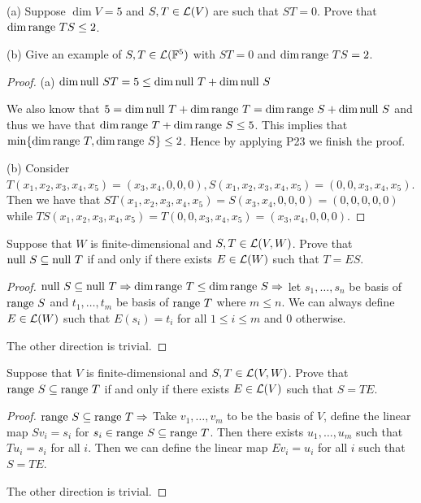 \documentclass{extarticle}
\begin{document}
\begin{problem}{24}
    (a) Suppose \(\dim V = 5\) and \(S, T \in \mathcal{L}(V)\) are such 
    that \(ST = 0\). Prove that \(\dim \text{range } TS \leq 2\). 

    (b) Give an example of \(S, T \in \mathcal{L}(\mathbb{F}^5)\) with \(ST=0\) and \(\dim \text{range } TS = 2\).
    
\end{problem}


\begin{proof}
(a) \(\dim \text{null } ST = 5 \leq \dim \text{null } T + \dim \text{null } S\)

We also know that  \(5 = \dim \text{null } T + \dim \text{range } T = \dim \text{range } S + \dim \text{null } S\) 
and thus we have that \(\dim \text{range } T + \dim \text{range } S \leq 5\). This implies that \(\min 
\{\dim \text{range } T, \dim \text{range } S\} \leq 2\). Hence by applying P23 we finish the proof. 

(b) Consider \(T(x_1, x_2, x_3, x_4, x_5) = (x_3, x_4, 0, 0, 0), S(x_1, x_2, x_3, 
x_4, x_5) = (0,0,x_3,x_4, x_5)\). Then we have that \(ST(x_1, x_2, x_3,x_4,x_5)
= S(x_3, x_4, 0,0,0) = (0,0,0,0,0)\) while \(TS(x_1, x_2, x_3, x_4, x_5)
= T(0,0,x_3,x_4, x_5) = (x_3, x_4, 0,0,0)\).

\end{proof}

\begin{problem}{25}
    Suppose that \(W\) is finite-dimensional and \(S, T \in \mathcal{L}(V, W)\). Prove that 
    \(\text{null } S \subseteq \text{null } T\) if and only if there exists \(E \in \mathcal{L}(W)\)
    such that \(T = ES\).
\end{problem}

\begin{proof}
\(\text{null } S \subseteq \text{null } T \Rightarrow \dim \text{range } T \leq \dim \text{range } S \Rightarrow\)
let \(s_1, \ldots, s_n\) be basis of \(\text{range } S\) and \(t_1, \ldots, t_m\) be basis of \(\text{range } T\)
where \(m \leq n\). We can always define \(E \in \mathcal{L} (W)\) such that \(E(s_i) = t_i\) for all 
\(1 \leq i \leq m\) and 0 otherwise. 

The other direction is trivial. 
\end{proof}

\begin{problem}{26}
    Suppose that \(V\) is finite-dimensional and \(S, T \in \mathcal{L}(V, W)\). Prove that 
    \(\text{range } S \subseteq \text{range } T\) if and only if there exists \(E \in \mathcal{L}(V)\) 
    such that \(S = TE\). 
\end{problem}

\begin{proof}

    \(\text{range } S \subseteq \text{range } T \Rightarrow\) Take \(v_1, \ldots, v_m\) to be the basis 
    of \(V\), define the linear map \(S v_i = s_i\) for \(s_i \in \text{range } S \subseteq \text{range } T\).
    Then there exists \(u_1, \ldots, u_m\) such that \(T u_i = s_i\) for all \(i\). Then we 
    can define the linear map \(E v_i = u_i\) for all \(i\) such that \(S = TE\).  

    The other direction is trivial. 
\end{proof}
\end{document}
